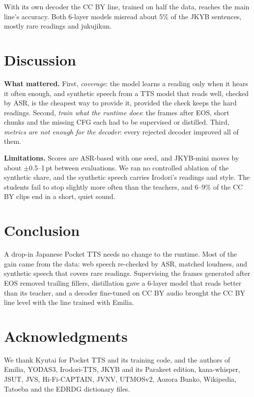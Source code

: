 \documentclass[10pt,a4paper,twocolumn]{article}
\newcommand{\pt}{\,pt}
\begin{document}
With its own decoder the CC BY line, trained on half the data, reaches
the main line's accuracy. Both 6-layer models misread about 5\% of the JKYB
sentences, mostly rare readings and jukujikun.

\section{Discussion}
\textbf{What mattered.} First, \emph{coverage}: the model learns a reading only when it hears it
often enough, and synthetic speech from a TTS model that reads well, checked by ASR, is the cheapest
way to provide it, provided the check keeps the hard readings. Second, \emph{train what the runtime
does}: the frames after EOS, short chunks and the missing CFG each had to be supervised or distilled.
Third, \emph{metrics are not enough for the decoder}: every rejected decoder improved all of them.

\textbf{Limitations.} Scores are ASR-based with one seed, and JKYB-mini moves by about
$\pm$0.5--1\pt{} between evaluations. We ran no controlled ablation of the synthetic share, and the
synthetic speech carries Irodori's readings and style. The students fail to stop slightly more often
than the teachers, and 6--9\% of the CC BY clips end in a short, quiet sound.

\section{Conclusion}
A drop-in Japanese Pocket TTS needs no change to the runtime. Most of the gain came from the data:
web speech re-checked by ASR, matched loudness, and synthetic speech that covers rare readings.
Supervising the frames generated after EOS removed trailing fillers, distillation gave a 6-layer
model that reads better than its teacher, and a decoder fine-tuned on CC BY audio brought the CC BY
line level with the line trained with Emilia.

\section*{Acknowledgments}
We thank Kyutai for Pocket TTS and its training code, and the authors of Emilia, YODAS3, Irodori-TTS,
JKYB and its Parakeet edition, kana-whisper, JSUT, JVS, Hi-Fi-CAPTAIN, JVNV, UTMOSv2, Aozora Bunko,
Wikipedia, Tatoeba and the EDRDG dictionary files.
\end{document}
